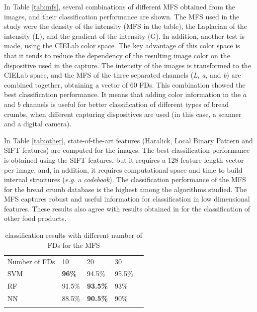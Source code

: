 In Table \ref{tab:mfs}, several combinations of different MFS obtained from the images, and their classification performance are shown. The MFS used in the study were the density of the intensity (MFS in the table), the Laplacian of the intensity (L), and the gradient of the intensity (G). In addition, another test is made, using the CIELab color space. The key advantage of this color space is that it tends to reduce the dependency of the resulting image color on the dispositive used in the capture. The intensity of the images is transformed to the CIELab space, and the MFS of the three separated channels ({\em L}, {\em a}, and {\em b}) are combined together, obtaining a vector of $60$ FDs. This combination showed the best classification performance. It means that adding color information in the $a$ and $b$ channels is useful for better classification of different types of bread crumbs, when different capturing dispositives are used (in this case, a scanner and a digital camera).

In Table \ref{tab:other}, state-of-the-art features (Haralick, Local Binary Pattern and SIFT features) are computed for the images. The best classification performance is obtained using the SIFT features, but it requires a $128$ feature length vector per image, and, in addition, it requires computational space and time to build internal structures ({\em e.g.} a {\em codebook}). The classification performance of the MFS for the bread crumb database is the highest among the algorithms studied. The MFS captures robust and useful information for classification in low dimensional features. These results also agree with results obtained in \cite{Bosch2011} for the classification of other food products.

\begin{table}
\caption{classification results with different number of FDs for the MFS}
\label{tab:number}       %
\begin{tabular}{lllll}
\hline\noalign{\smallskip}
Number of FDs & 10  & 20 & 30 \\
\noalign{\smallskip}\hline\noalign{\smallskip}
SVM & \textbf{96\%} & 94.5\% & 95.5\% \\
RF  & 91.5\% & \textbf{93.5\%} & 93\% \\
NN & 88.5\% & \textbf{90.5\%} & 90\% \\
\noalign{\smallskip}\hline
\end{tabular}
\end{table}


